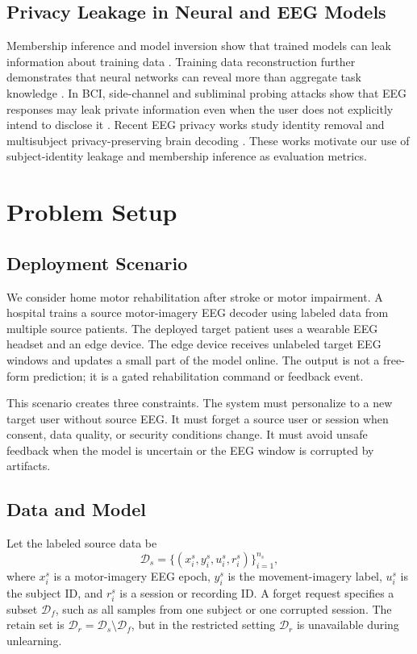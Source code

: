 \documentclass[10pt,twocolumn]{article}
\begin{document}
\subsection{Privacy Leakage in Neural and EEG Models}
Membership inference and model inversion show that trained models can leak information about training data \cite{fredrikson2015model,shokri2017membership,carlini2022membership}. Training data reconstruction further demonstrates that neural networks can reveal more than aggregate task knowledge \cite{balle2022reconstructing}. In BCI, side-channel and subliminal probing attacks show that EEG responses may leak private information even when the user does not explicitly intend to disclose it \cite{martinovic2012bci,frank2017subliminal}. Recent EEG privacy works study identity removal and multisubject privacy-preserving brain decoding \cite{tian2025brainguard,wang2025idremoval}. These works motivate our use of subject-identity leakage and membership inference as evaluation metrics.

\section{Problem Setup}
\subsection{Deployment Scenario}
We consider home motor rehabilitation after stroke or motor impairment. A hospital trains a source motor-imagery EEG decoder using labeled data from multiple source patients. The deployed target patient uses a wearable EEG headset and an edge device. The edge device receives unlabeled target EEG windows and updates a small part of the model online. The output is not a free-form prediction; it is a gated rehabilitation command or feedback event.

This scenario creates three constraints. The system must personalize to a new target user without source EEG. It must forget a source user or session when consent, data quality, or security conditions change. It must avoid unsafe feedback when the model is uncertain or the EEG window is corrupted by artifacts.

\subsection{Data and Model}
Let the labeled source data be
\begin{equation}
\mathcal{D}_s=\{(x_i^s,y_i^s,u_i^s,r_i^s)\}_{i=1}^{n_s},
\end{equation}
where $x_i^s$ is a motor-imagery EEG epoch, $y_i^s$ is the movement-imagery label, $u_i^s$ is the subject ID, and $r_i^s$ is a session or recording ID. A forget request specifies a subset $\mathcal{D}_f$, such as all samples from one subject or one corrupted session. The retain set is $\mathcal{D}_r=\mathcal{D}_s\setminus \mathcal{D}_f$, but in the restricted setting $\mathcal{D}_r$ is unavailable during unlearning.
\end{document}
